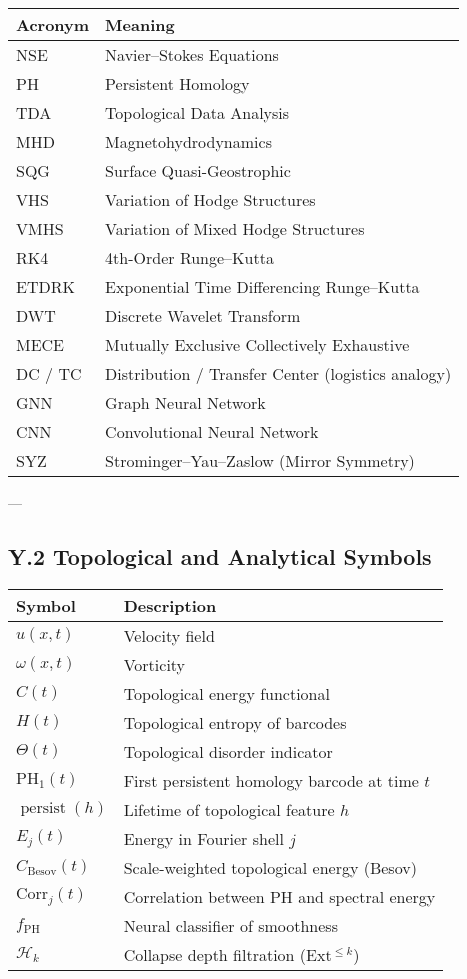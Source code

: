 \documentclass[11pt]{article}
\theoremstyle{definition}
\begin{document}
\begin{tabular}{ll}
\textbf{Acronym} & \textbf{Meaning} \\
\hline
NSE & Navier–Stokes Equations \\
PH & Persistent Homology \\
TDA & Topological Data Analysis \\
MHD & Magnetohydrodynamics \\
SQG & Surface Quasi-Geostrophic \\
VHS & Variation of Hodge Structures \\
VMHS & Variation of Mixed Hodge Structures \\
RK4 & 4th-Order Runge–Kutta \\
ETDRK & Exponential Time Differencing Runge–Kutta \\
DWT & Discrete Wavelet Transform \\
MECE & Mutually Exclusive Collectively Exhaustive \\
DC / TC & Distribution / Transfer Center (logistics analogy) \\
GNN & Graph Neural Network \\
CNN & Convolutional Neural Network \\
SYZ & Strominger–Yau–Zaslow (Mirror Symmetry) \\
\end{tabular}

---

\subsection*{Y.2 Topological and Analytical Symbols}

\begin{tabular}{ll}
\textbf{Symbol} & \textbf{Description} \\
\hline
$u(x,t)$ & Velocity field \\
$\omega(x,t)$ & Vorticity \\
$C(t)$ & Topological energy functional \\
$H(t)$ & Topological entropy of barcodes \\
$\Theta(t)$ & Topological disorder indicator \\
$\mathrm{PH}_1(t)$ & First persistent homology barcode at time $t$ \\
$\operatorname{persist}(h)$ & Lifetime of topological feature $h$ \\
$E_j(t)$ & Energy in Fourier shell $j$ \\
$C_{\mathrm{Besov}}(t)$ & Scale-weighted topological energy (Besov) \\
$\mathrm{Corr}_j(t)$ & Correlation between PH and spectral energy \\
$f_{\mathrm{PH}}$ & Neural classifier of smoothness \\
$\mathcal{H}_k$ & Collapse depth filtration (Ext$^{\leq k}$) \\
\end{tabular}
\end{document}
